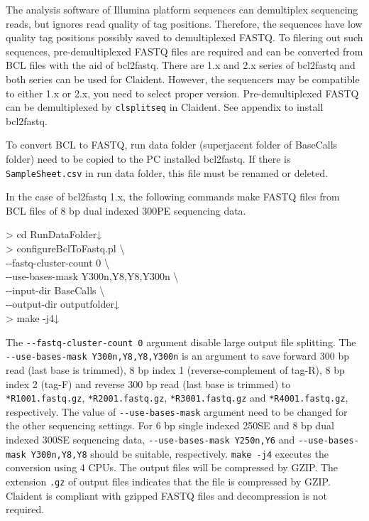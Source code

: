 \documentclass[titlepage,10pt,a4paper,english]{jsbook}
\newenvironment{cmd}{\begin{oframed}\raggedright\ttfamily\footnotesize\setlength{\baselineskip}{1.4em}}{\end{oframed}\vspace{-1em}}
\begin{document}
The analysis software of Illumina platform sequences can demultiplex sequencing reads, but ignores read quality of tag positions.
Therefore, the sequences have low quality tag positions possibly saved to demultiplexed FASTQ.
To filering out such sequences, pre-demultiplexed FASTQ files are required and can be converted from BCL files with the aid of bcl2fastq.
There are 1.x and 2.x series of bcl2fastq and both series can be used for Claident.
However, the sequencers may be compatible to either 1.x or 2.x, you need to select proper version.
Pre-demultiplexed FASTQ can be demultiplexed by \texttt{clsplitseq} in Claident.
See appendix to install bcl2fastq.

To convert BCL to FASTQ, run data folder (superjacent folder of BaseCalls folder) need to be copied to the PC installed bcl2fastq.
If there is \texttt{SampleSheet.csv} in run data folder, this file must be renamed or deleted.

In the case of bcl2fastq 1.x, the following commands make FASTQ files from BCL files of 8 bp dual indexed 300PE sequencing data.

\begin{cmd}
{\textgreater} cd RunDataFolder↓\\
{\textgreater} configureBclToFastq.pl {\textbackslash}\\
{-}{-}fastq-cluster-count 0 {\textbackslash}\\
{-}{-}use-bases-mask Y300n,Y8,Y8,Y300n {\textbackslash}\\
{-}{-}input-dir BaseCalls {\textbackslash}\\
{-}{-}output-dir outputfolder↓\\
{\textgreater} make -j4↓
\end{cmd}

The \texttt{{-}{-}fastq-cluster-count 0} argument disable large output file splitting.
The \texttt{{-}{-}use-bases-mask Y300n,Y8,Y8,Y300n} is an argument to save forward 300 bp read (last base is trimmed), 8 bp index 1 (reverse-complement of tag-R), 8 bp index 2 (tag-F) and reverse 300 bp read (last base is trimmed) to \texttt{*{\textunderscore}R1{\textunderscore}001.fastq.gz}, \texttt{*{\textunderscore}R2{\textunderscore}001.fastq.gz}, \texttt{*{\textunderscore}R3{\textunderscore}001.fastq.gz} and \texttt{*{\textunderscore}R4{\textunderscore}001.fastq.gz}, respectively.
The value of \texttt{{-}{-}use-bases-mask} argument need to be changed for the other sequencing settings.
For 6 bp single indexed 250SE and 8 bp dual indexed 300SE sequencing data, \texttt{{-}{-}use-bases-mask Y250n,Y6} and \texttt{{-}{-}use-bases-mask Y300n,Y8,Y8} should be suitable, respectively.
\texttt{make -j4} executes the conversion using 4 CPUs.
The output files will be compressed by GZIP.
The extension \texttt{.gz} of output files indicates that the file is compressed by GZIP.
Claident is compliant with gzipped FASTQ files and decompression is not required.
\end{document}
